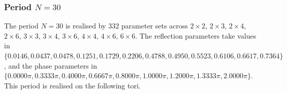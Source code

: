 \par
\subsubsection{Period $N = 30$}
The period $N=30$ is realised by $332$ parameter sets across $2\times2$, $2\times3$, $2\times4$, $2\times6$, $3\times3$, $3\times4$, $3\times6$, $4\times4$, $4\times6$, $6\times6$. The reflection parameters take values in $\{0.0146, 0.0437, 0.0478, 0.1251, 0.1729, 0.2206, 0.4788, 0.4950, 0.5523, 0.6106, 0.6617, 0.7364\}$, and the phase parameters in $\{0.0000\pi, 0.3333\pi, 0.4000\pi, 0.6667\pi, 0.8000\pi, 1.0000\pi, 1.2000\pi, 1.3333\pi, 2.0000\pi\}$. This period is realised on the following tori.
